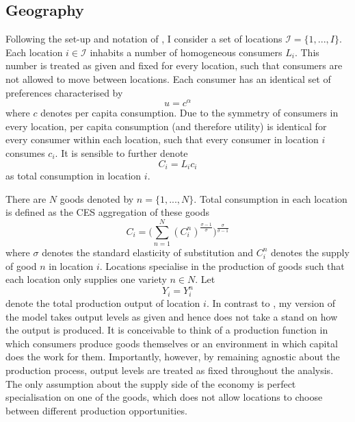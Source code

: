 \documentclass[11pt, oneside]{article}   	%
\begin{document}
\subsection{Geography}

Following the set-up and notation of \cite{fajgelbaum_optimal_2017}, I consider a set of locations $\mathcal{I} =\{ 1,...,I\}$. Each location $i \in \mathcal{I}$ inhabits a number of homogeneous consumers $L_{i}$. This number is treated as given and fixed for every location, such that consumers are not allowed to move between locations. Each consumer has an identical set of preferences characterised by
\begin{equation*}
  u = c^{\alpha}
\end{equation*}
where $c$ denotes per capita consumption. Due to the symmetry of consumers in every location, per capita consumption (and therefore utility) is identical for every consumer within each location, such that every consumer in location $i$ consumes $c_{i}$. It is sensible to further denote
\begin{equation*}
  C_{i} = L_{i}c_{i}
\end{equation*}
as total consumption in location $i$.

There are $N$ goods denoted by $n =\{ 1,...,N\}$. Total consumption in each location is defined as the CES aggregation of these goods
\begin{equation*}
  C_{i} = \bigg( \sum_{n=1}^{N} (C_{i}^{n})^{\frac{\sigma-1}{\sigma}}\bigg)^{\frac{\sigma}{\sigma-1}}
\end{equation*}
where $\sigma$ denotes the standard elasticity of substitution and $C_{i}^{n}$ denotes the supply of good $n$ in location $i$. Locations specialise in the production of goods such that each location only supplies one variety $n \in N$. Let
\begin{equation*}
  Y_{i} = Y_{i}^{n}
\end{equation*}
denote the total production output of location $i$. In contrast to \citeauthor{fajgelbaum_optimal_2017}, my version of the model takes output levels as given and hence does not take a stand on how the output is produced. It is conceivable to think of a production function in which consumers produce goods themselves or an environment in which capital does the work for them. Importantly, however, by remaining agnostic about the production process, output levels are treated as fixed throughout the analysis. The only assumption about the supply side of the economy is perfect specialisation on one of the goods, which does not allow locations to choose between different production opportunities.
\end{document}
